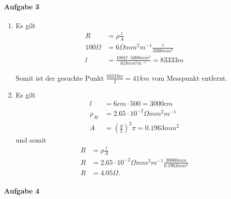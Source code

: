 \documentclass{article}
\begin{document}
\paragraph{Aufgabe 3}

\begin{enumerate}
    \item Es gilt
    \begin{align*}
        R &= \rho \frac{l}{A} \\
        100 \Omega &= 6 \Omega mm^2 m^{-1} \frac{l}{5000mm^2} \\
        l &= \frac{100 \Omega \cdot 5000 mm^2}{6 \Omega mm^2 m^{-1}} = 83333m
    \end{align*}

    Somit ist der gesuchte Punkt $\frac{83333m}{2} = 41km$ vom Messpunkt entfernt.

    \item Es gilt
    \begin{align*}
        l &= 6cm \cdot 500 = 3000cm \\
        \rho_{Al} &= 2.65 \cdot 10^{-2} \Omega mm^2 m^{-1} \\
        A &= \left(\frac{d}{2}\right)^2 \pi = 0.1963mm^2
    \end{align*}
    und somit
    \begin{align*}
        R &= \rho \frac{l}{A} \\
        R &= 2.65 \cdot 10^{-2} \Omega mm^2 m^{-1} \frac{30000mm}{0.1963mm^2} \\
        R &= 4.05 \Omega.
    \end{align*}
\end{enumerate}

\paragraph{Aufgabe 4}
\end{document}
